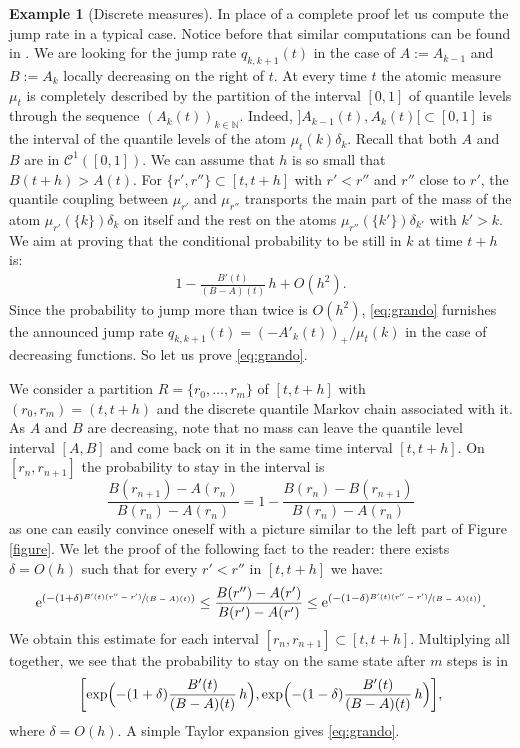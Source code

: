 \documentclass[JEP,XML,SOM,Unicode,NoEqCountersInSection,NoFloatCountersInSection,published]{cedram}
\theoremstyle{plain}
\theoremstyle{definition}
\newtheorem{ex}[them]{Example}
\newcommand{\N}{\mathbb{N}}
\newcommand{\e}{\mathrm{e}}
\begin{document}
\begin{ex}[Discrete measures]
In place of a complete proof let us compute the jump rate in a typical case. Notice before that similar computations can be found in \cite[\S 4]{Ju_ejp}. We are looking for the jump rate $q_{k,k+1}(t)$ in the case of $A:=A_{k-1}$ and $B:=A_k$ locally decreasing on the right of $t$. At every time $t$ the atomic measure $\mu_t$ is completely described by the partition of the interval $[0,1]$ of quantile levels through the sequence $(A_k(t))_{k\in \N}$. Indeed, $]A_{k-1}(t),A_k(t)[\subset [0,1]$ is the interval
of the quantile levels of the atom $\mu_t(k)\delta_k$. Recall that both $A$ and $B$ are in $\mathcal{C}^1([0,1])$. We can assume that $h$ is so small that $B(t+h)>A(t)$. For $\{r',r''\}\subset[t,t+h]$ with $r'<r''$ and $r''$ close to $r'$, the quantile coupling between $\mu_{r'}$ and $\mu_{r''}$ transports the main part of the mass of the atom $\mu_{r'}(\{k\})\delta_k$ on itself and the rest on the atoms $\mu_{r''}(\{k'\})\delta_{k'}$ with $k'>k$. We aim at proving that the conditional probability to be still in $k$ at time $t+h$ is:\vspace*{-3pt}
\begin{align}\label{eq:grando}
1-\frac{B'(t)}{(B-A)(t)}\,h+O(h^2).
\end{align}
Since the probability to jump more than twice is $O(h^2)$, \eqref{eq:grando} furnishes the announced jump rate $q_{k,k+1}(t)=(-A'_k(t))_+/\mu_t(k)$ in the case of decreasing functions. So let us prove \eqref{eq:grando}.

We consider a partition $R=\{r_0,\ldots,r_{m}\}$ of $[t,t+h]$ with $(r_0,r_{m})=(t,t+h)$ and the discrete quantile Markov chain associated with it. As $A$ and $B$ are decreasing, note that no mass can leave the quantile level interval $[A,B]$ and come back on it in the same time interval $[t,t+h]$. On $[r_n,r_{n+1}]$ the probability to stay in the interval is
\[
\frac{B(r_{n+1})-A(r_n)}{B(r_n)-A(r_n)}=1-\frac{B(r_n)-B(r_{n+1})}{B(r_n)-A(r_n)}
\]
as one can easily convince oneself with a picture similar to the left part of Figure \ref{figure}. We let the proof of the following fact to the reader: there exists $\delta=O(h)$ such that for every $r'<r''$ in $[t,t+h]$ we have:
\[\e^{\left(-(1+\delta)\sfrac{B'(t)(r''-r')}{(B-A)(t)}\right)}\leq \frac{B(r'')-A(r')}{B(r')-A(r')}\leq \e^{\left(-(1-\delta)\sfrac{B'(t)(r''-r')}{(B-A)(t)}\right)}.\]
We obtain this estimate for each interval $[r_n,r_{n+1}]\subset [t,t+h]$. Multiplying all together, we see that the probability to stay on the same state after $m$ steps is in
\[
\biggl[\exp\Bigl(-(1+\delta)\frac{B'(t)}{(B-A)(t)}\,h \Bigr),\exp\Bigl(-(1-\delta)\frac{B'(t)}{(B-A)(t)}\,h \Bigr)\biggr],
\]
where $\delta=O(h)$. A simple Taylor expansion gives \eqref{eq:grando}.\end{ex}
\end{document}

